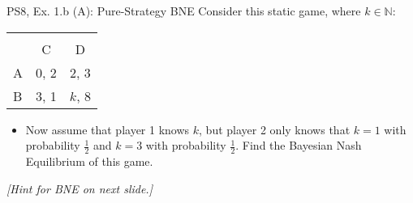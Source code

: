 \begin{frame}{PS8, Ex. 1.b (A): Pure-Strategy BNE}
    Consider this static game, where $k\in\mathbb{N}:$
    \vspace{-16pt}
    \begin{table}
      \begin{tabular}{l|c|c|}
        \multicolumn{1}{c}{} & \multicolumn{2}{c}{} \\
        \multicolumn{1}{c}{} & \multicolumn{1}{c}{C} & \multicolumn{1}{c}{D} \\\cline{2-3}
        A & 0, 2 & 2, 3 \\\cline{2-3}
        B & 3, 1 & $k$, 8 \\\cline{2-3}
      \end{tabular}
    \end{table}
    \vspace{-4pt}
    \begin{itemize}
      \item[(b)] Now assume that player 1 knows $k$, but player 2 only knows that $k = 1$ with probability $\frac{1}{2}$ and $k = 3$ with probability $\frac{1}{2}$. Find the Bayesian Nash Equilibrium of this game.
    \end{itemize}
    \textit{[Hint for BNE on next slide.]}
    \vfill\null
\end{frame}
